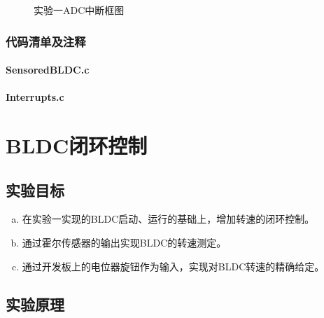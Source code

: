 \documentclass[a4paper,11pt]{ctexart}
\begin{document}
\begin{spacing}{1.5}
\begin{figure}[h]
\begin{tikzpicture}
	\end{tikzpicture}
	\caption{实验一ADC中断框图}\label{figure:实验一ADC中断框图}
\end{figure}
\subsubsection{代码清单及注释}
\paragraph{SensoredBLDC.c}
\begin{spacing}{1}
	
\end{spacing}

\paragraph{Interrupts.c}
\begin{spacing}{1}
	
\end{spacing}

\section{BLDC闭环控制}
\subsection{实验目标}
\begin{enumerate}[a.,topsep=0pt]
	\setlength{\itemsep}{-0.25\baselineskip}
	\item 在实验一实现的BLDC启动、运行的基础上，增加转速的闭环控制。
	\item 通过霍尔传感器的输出实现BLDC的转速测定。
	\item 通过开发板上的电位器旋钮作为输入，实现对BLDC转速的精确给定。
\end{enumerate}
\subsection{实验原理}

\end{spacing}
\end{document}
